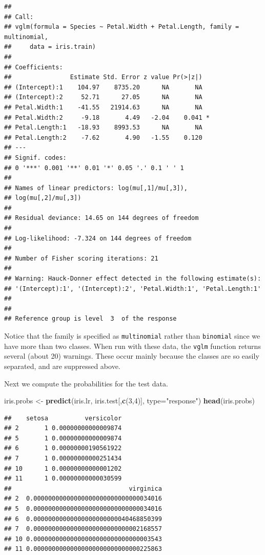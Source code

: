 \documentclass[
]{krantz}
\newenvironment{Shaded}{\begin{snugshade}}{\end{snugshade}}
\newcommand{\DataTypeTok}[1]{\textcolor[rgb]{0.13,0.29,0.53}{#1}}
\newcommand{\DecValTok}[1]{\textcolor[rgb]{0.00,0.00,0.81}{#1}}
\newcommand{\KeywordTok}[1]{\textcolor[rgb]{0.13,0.29,0.53}{\textbf{#1}}}
\newcommand{\NormalTok}[1]{#1}
\newcommand{\StringTok}[1]{\textcolor[rgb]{0.31,0.60,0.02}{#1}}
\begin{document}
\begin{verbatim}
## 
## Call:
## vglm(formula = Species ~ Petal.Width + Petal.Length, family = multinomial, 
##     data = iris.train)
## 
## Coefficients: 
##                Estimate Std. Error z value Pr(>|z|)  
## (Intercept):1    104.97    8735.20      NA       NA  
## (Intercept):2     52.71      27.05      NA       NA  
## Petal.Width:1    -41.55   21914.63      NA       NA  
## Petal.Width:2     -9.18       4.49   -2.04    0.041 *
## Petal.Length:1   -18.93    8993.53      NA       NA  
## Petal.Length:2    -7.62       4.90   -1.55    0.120  
## ---
## Signif. codes:  
## 0 '***' 0.001 '**' 0.01 '*' 0.05 '.' 0.1 ' ' 1
## 
## Names of linear predictors: log(mu[,1]/mu[,3]), 
## log(mu[,2]/mu[,3])
## 
## Residual deviance: 14.65 on 144 degrees of freedom
## 
## Log-likelihood: -7.324 on 144 degrees of freedom
## 
## Number of Fisher scoring iterations: 21 
## 
## Warning: Hauck-Donner effect detected in the following estimate(s):
## '(Intercept):1', '(Intercept):2', 'Petal.Width:1', 'Petal.Length:1'
## 
## 
## Reference group is level  3  of the response
\end{verbatim}

Notice that the family is specified as \texttt{multinomial} rather than \texttt{binomial} since we have more than two classes. When run with these data, the \texttt{vglm} function returns several (about 20) warnings. These occur mainly because the classes are so easily separated, and are suppressed above.

Next we compute the probabilities for the test data.

\begin{Shaded}
\begin{Highlighting}[]
\NormalTok{iris.probs \textless{}{-}}\StringTok{ }\KeywordTok{predict}\NormalTok{(iris.lr, iris.test[,}\KeywordTok{c}\NormalTok{(}\DecValTok{3}\NormalTok{,}\DecValTok{4}\NormalTok{)], }\DataTypeTok{type=}\StringTok{"response"}\NormalTok{)}
\KeywordTok{head}\NormalTok{(iris.probs)}
\end{Highlighting}
\end{Shaded}

\begin{verbatim}
##    setosa          versicolor
## 2       1 0.00000000000009874
## 5       1 0.00000000000009874
## 6       1 0.00000000190561922
## 7       1 0.00000000000251434
## 10      1 0.00000000000001202
## 11      1 0.00000000000030599
##                                virginica
## 2  0.00000000000000000000000000000034016
## 5  0.00000000000000000000000000000034016
## 6  0.00000000000000000000000040468850399
## 7  0.00000000000000000000000000002168557
## 10 0.00000000000000000000000000000003543
## 11 0.00000000000000000000000000000225863
\end{verbatim}
\end{document}
